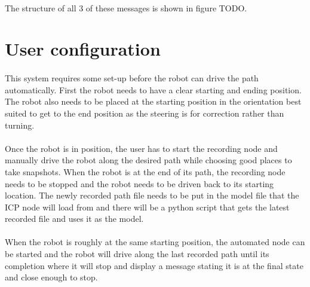 \paragraph{}
The structure of all 3 of these messages is shown in figure TODO.


\section{User configuration}
\paragraph{}
This system requires some set-up before the robot can drive the path automatically. First the robot needs to have a clear starting and ending position. The robot also needs to be placed at the starting position in the orientation best suited to get to the end position as the steering is for correction rather than turning.

\paragraph{}
Once the robot is in position, the user has to start the recording node and manually drive the robot along the desired path while choosing good places to take snapshots. When the robot is at the end of its path, the recording node needs to be stopped and the robot needs to be driven back to its starting location. The newly recorded path file needs to be put in the model file that the ICP node will load from and there will be a python script that gets the latest recorded file and uses it as the model.

\paragraph{}
When the robot is roughly at the same starting position, the automated node can be started and the robot will drive along the last recorded path until its completion where it will stop and display a message stating it is at the final state and close enough to stop.

